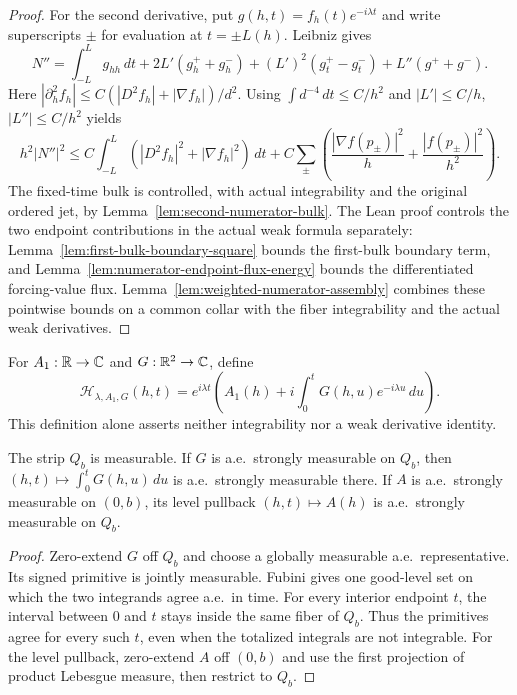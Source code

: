 \begin{proof}
For the second derivative, put $g(h,t)=f_h(t)e^{-i\lambda t}$ and
write superscripts $\pm$ for evaluation at $t=\pm L(h)$. Leibniz gives
\[
 N''=\int_{-L}^L g_{hh}\,dt+2L'(g_h^++g_h^-)
                  +(L')^2(g_t^+-g_t^-)+L''(g^++g^-).
\]
Here $|\partial_h^2f_h|\le C(|D^2f_h|+|\nabla f_h|)/d^2$.
Using $\int d^{-4}\,dt\le C/h^2$ and
$|L'|\le C/h$, $|L''|\le C/h^2$ yields
\[
 h^2|N''|^2\le C\int_{-L}^L(|D^2f_h|^2+|\nabla f_h|^2)\,dt
       +C\sum_\pm\left(\frac{|\nabla f(p_\pm)|^2}{h}
                      +\frac{|f(p_\pm)|^2}{h^2}\right).
\]
The fixed-time bulk is controlled, with actual integrability and the original
ordered jet, by Lemma~\ref{lem:second-numerator-bulk}.
The Lean proof controls the two endpoint contributions in the actual
weak formula separately: Lemma~\ref{lem:first-bulk-boundary-square}
bounds the first-bulk boundary term, and
Lemma~\ref{lem:numerator-endpoint-flux-energy} bounds the differentiated
forcing-value flux. Lemma~\ref{lem:weighted-numerator-assembly} combines
these pointwise bounds on a common collar with the fiber integrability
and the actual weak derivatives.
\end{proof}

\begin{definition}
\label{def:quarter-reconstruction-level}
\leanok
For $A_1:\mathbb{R}\to\mathbb{C}$ and $G:\mathbb{R}^2\to\mathbb{C}$, define
\[
 \mathcal H_{\lambda,A_1,G}(h,t)
 =e^{i\lambda t}\left(A_1(h)+i\int_0^t G(h,u)e^{-i\lambda u}\,du\right).
\]
This definition alone asserts neither integrability nor a weak derivative
identity.
\end{definition}

\begin{lemma}
\label{lem:quarter-primitive-measurable}
\leanok
The strip $Q_b$ is measurable.
If $G$ is a.e.\ strongly measurable on $Q_b$, then
$(h,t)\mapsto\int_0^tG(h,u)\,du$ is a.e.\ strongly measurable there.
If $A$ is a.e.\ strongly measurable on $(0,b)$, its level pullback
$(h,t)\mapsto A(h)$ is a.e.\ strongly measurable on $Q_b$.
\end{lemma}

\begin{proof}
\leanok
Zero-extend $G$ off $Q_b$ and choose a globally measurable a.e.\
representative. Its signed primitive is jointly measurable.
Fubini gives one good-level set on which the two integrands agree a.e.\
in time. For every interior endpoint $t$, the interval between $0$ and
$t$ stays inside the same fiber of $Q_b$. Thus the primitives agree for
every such $t$, even when the totalized integrals are not integrable.
For the level pullback, zero-extend $A$ off $(0,b)$ and use the first
projection of product Lebesgue measure, then restrict to $Q_b$.
\end{proof}

